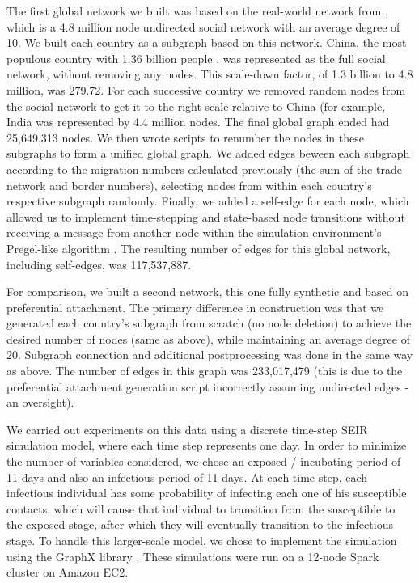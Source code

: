 \documentclass[10pt, journal,onecolumn]{IEEEtran}
\begin{document}
The first global network we built was based on the real-world network from \citep{topcoderdata},
which is a 4.8 million node undirected social network with an average degree of 10. We built each country
as a subgraph based on this network. China, the most populous country with 1.36 billion people
\citep{ciapopulation}, was represented as the full social network, without removing any nodes.
This scale-down factor, of 1.3 billion to 4.8 million, was 279.72.
For each successive country we removed random
nodes from the social network to get it to the right scale relative to China (for example, India
was represented by 4.4 million nodes. The final global graph ended had 25,649,313 nodes.
We then wrote scripts to renumber the nodes in these subgraphs to form a unified global graph.
We added edges beween each subgraph according to the migration numbers calculated previously
(the sum of the trade network and border numbers),
selecting nodes from within each country's respective subgraph randomly.
Finally, we added a self-edge for each node, which allowed us to implement time-stepping and
state-based node transitions without receiving a message from another node within the simulation
environment's Pregel-like algorithm \citep{malewicz2010pregel}.
The resulting number of edges for this global network, including self-edges, was 117,537,887.

For comparison, we built a second network, this one fully synthetic and based on preferential attachment.
The primary difference in construction was that we generated each country's subgraph from scratch
(no node deletion) to achieve the desired number of nodes (same as above), while maintaining an average
degree of 20. Subgraph connection and additional postprocessing was done in the same way as above.
The number of edges in this graph was 233,017,479 (this is due to the preferential attachment generation
script incorrectly assuming undirected edges - an oversight).

We carried out experiments on this data using a discrete time-step SEIR simulation model,
where each time step represents one day. In order to minimize the number of variables considered,
we chose an exposed / incubating period of 11 days and also an infectious period of 11 days.
At each time step, each
infectious individual has some probability of infecting each one of his susceptible contacts, which
will cause that individual to transition from the susceptible to the exposed stage, after which
they will eventually transition to the infectious stage. To handle this larger-scale model, we chose
to implement the simulation using the GraphX library \citep{xin2013graphx}.
These simulations were run on a 12-node Spark cluster on Amazon EC2.
\end{document}
